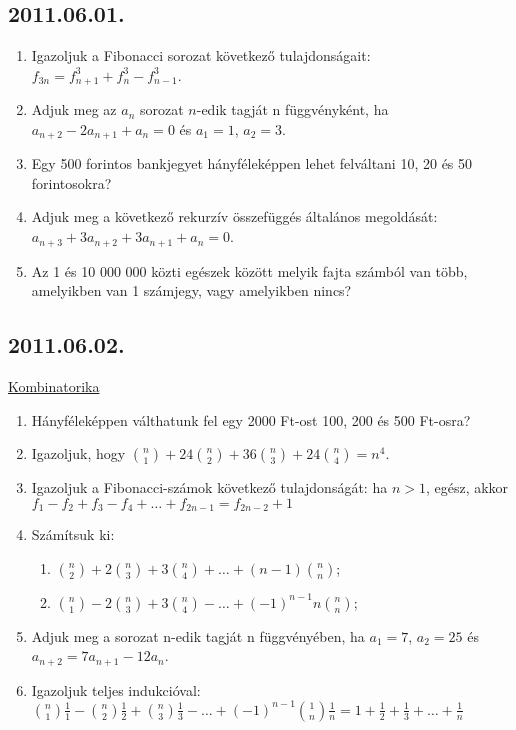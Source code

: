 \subsection*{2011.06.01.}
\begin{enumerate}
\item Igazoljuk a Fibonacci sorozat következő tulajdonságait: $f_{3n}=f_{n+1}^3+f_n^3-f_{n-1}^3$.
\item Adjuk meg az $a_n$ sorozat $n$-edik tagját n függvényként, ha $a_{n+2}-2a_{n+1}+a_n=0$ és $a_1=1$, $a_2=3$.
\item Egy 500 forintos bankjegyet hányféleképpen lehet felváltani 10, 20 és 50 forintosokra?
\item Adjuk meg a következő rekurzív összefüggés általános megoldását: $a_{n+3}+3a_{n+2}+3a_{n+1}+a_n=0$.
\item Az 1 és 10 000 000 közti egészek között melyik fajta számból van több, amelyikben van 1 számjegy, vagy amelyikben nincs?
\end{enumerate}

\subsection*{2011.06.02.}
\underline{Kombinatorika}
\begin{enumerate}
\item Hányféleképpen válthatunk fel egy 2000 Ft-ost 100, 200 és 500 Ft-osra?
\item Igazoljuk, hogy $\binom n1+24\binom n2+36\binom n3+24\binom n4=n^4$.
\item Igazoljuk a Fibonacci-számok következő tulajdonságát: ha $n>1$, egész, akkor
\\$f_1-f_2+f_3-f_4+\ldots+f_{2n-1}=f_{2n-2}+1$
\item Számítsuk ki:
\begin{enumerate}
\item $\binom n2+2\binom n3+3\binom n4+\ldots+(n-1)\binom nn$;
\item $\binom n1-2\binom n3+3\binom n4-\ldots+(-1)^{n-1}n\binom nn$;
\end{enumerate}
 \item Adjuk meg a sorozat n-edik tagját n függvényében, ha $a_1=7$, $a_2=25$ és $a_{n+2}=7a_{n+1}-12a_n$.
\item Igazoljuk teljes indukcióval:
$\binom n1\frac{1}{1}-\binom n2\frac{1}{2}+\binom n3\frac{1}{3}-\ldots+(-1)^{n-1}\binom 1n\frac{1}{n}=1+\frac{1}{2}+\frac{1}{3}+\ldots+\frac{1}{n}$
\end{enumerate}





